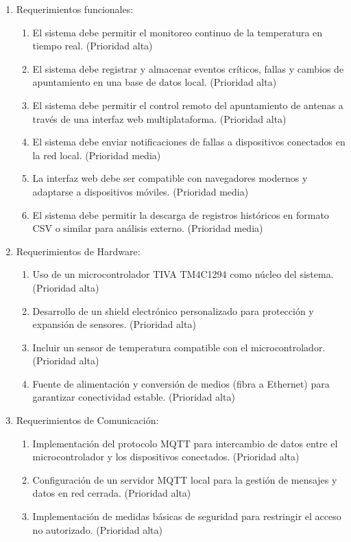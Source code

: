 \documentclass[
11pt, %
]{charter}
\begin{document}
\begin{enumerate}
	\item Requerimientos funcionales:
	\begin{enumerate}
		\item El sistema debe permitir el monitoreo continuo de la temperatura en tiempo real. (Prioridad alta)
		\item El sistema debe registrar y almacenar eventos críticos, fallas y cambios de apuntamiento en una base de datos local. (Prioridad alta)
		\item El sistema debe permitir el control remoto del apuntamiento de antenas a través de una interfaz web multiplataforma. (Prioridad alta)
		\item El sistema debe enviar notificaciones de fallas a dispositivos conectados en la red local. (Prioridad media)
		\item La interfaz web debe ser compatible con navegadores modernos y adaptarse a dispositivos móviles. (Prioridad media)
		\item El sistema debe permitir la descarga de registros históricos en formato CSV o similar para análisis externo. (Prioridad media)
	\end{enumerate}
	\item Requerimientos de Hardware:
	\begin{enumerate}
		\item Uso de un microcontrolador TIVA TM4C1294 como núcleo del sistema. (Prioridad alta)
		\item Desarrollo de un shield electrónico personalizado para protección y expansión de sensores. (Prioridad alta)
		\item Incluir un sensor de temperatura compatible con el microcontrolador. (Prioridad alta)
		\item  Fuente de alimentación y conversión de medios (fibra a Ethernet) para garantizar conectividad estable. (Prioridad alta)
	\end{enumerate}
	\item Requerimientos de Comunicación:
	\begin{enumerate}
		\item Implementación del protocolo MQTT para intercambio de datos entre el microcontrolador y los dispositivos conectados. (Prioridad alta)
		\item Configuración de un servidor MQTT local para la gestión de mensajes y datos en red cerrada. (Prioridad alta)
		\item Implementación de medidas básicas de seguridad para restringir el acceso no autorizado. (Prioridad alta)

\end{enumerate}
\end{enumerate}
\end{document}
